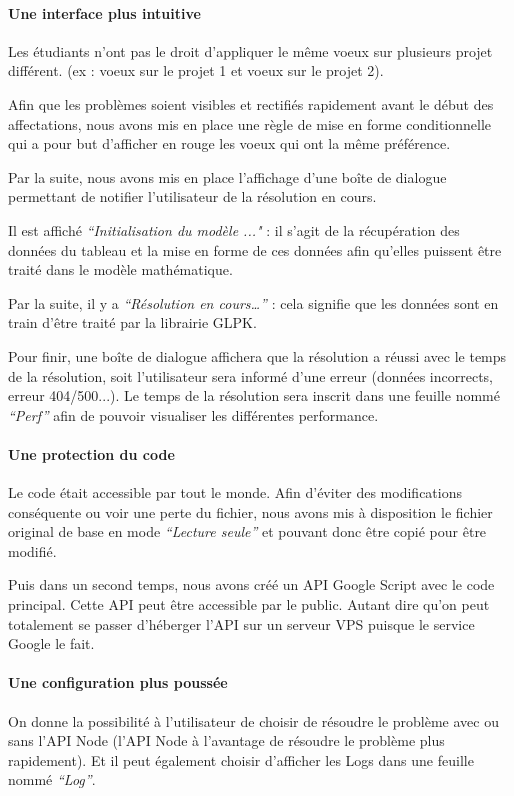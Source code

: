 \documentclass[final,poster]{polytech/polytech}
\begin{document}
\paragraph{Une interface plus intuitive}
Les étudiants n'ont pas le droit d'appliquer le même voeux sur plusieurs projet différent. (ex : voeux  sur le projet 1 et voeux  sur le projet 2).

Afin que les problèmes soient visibles et rectifiés rapidement avant le début des affectations, nous avons mis en place une règle de mise en forme conditionnelle qui a pour but d'afficher en rouge les voeux qui ont la même préférence.

Par la suite, nous avons mis en place l'affichage d'une boîte de dialogue permettant de notifier l'utilisateur de la résolution en cours.

 Il est affiché\textit{ “Initialisation du modèle ..."} : il s'agit de la récupération des données du tableau et la mise en forme de ces données afin qu'elles puissent être traité dans le modèle mathématique.
 
Par la suite, il y a \textit{“Résolution en cours…”} : cela signifie que les données sont en train d'être traité par la librairie GLPK.

Pour finir, une boîte de dialogue affichera que la résolution a réussi avec le temps de la résolution, soit l'utilisateur sera informé d'une erreur (données incorrects, erreur 404/500...). Le temps de la résolution sera inscrit dans une feuille nommé \textit{“Perf”} afin de pouvoir visualiser les différentes performance.

\paragraph{Une protection du code}
Le code était accessible par tout le monde. Afin d'éviter des modifications conséquente ou voir une perte du fichier, nous avons mis à disposition le fichier original de base en mode \textit{“Lecture seule”} et pouvant donc être copié pour être modifié. 

Puis dans un second temps, nous avons créé un API Google Script avec le code principal. Cette API peut être accessible par le public. Autant dire qu'on peut totalement se passer d'héberger l'API sur un serveur VPS puisque le service Google le fait.

\paragraph{Une configuration plus poussée}
On donne la possibilité à l'utilisateur de choisir de résoudre le problème avec ou sans l’API Node (l’API Node à l'avantage de résoudre le problème plus rapidement). Et il peut également choisir d'afficher les Logs dans une feuille nommé \textit{“Log”}.
\end{document}
